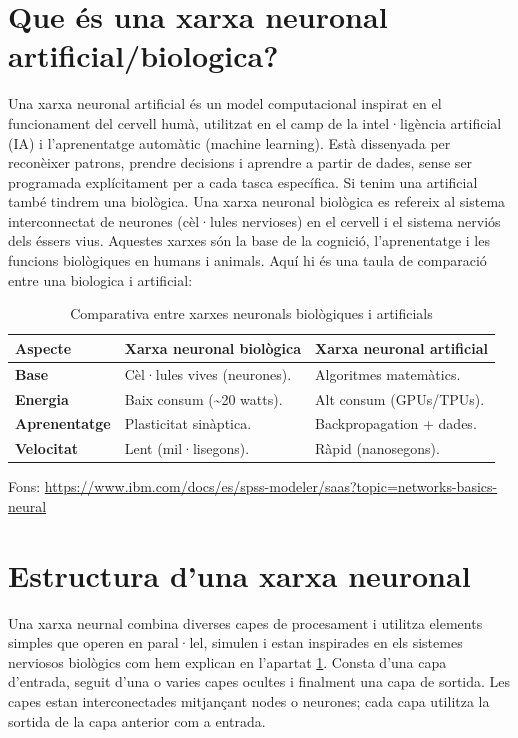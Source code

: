 {\section{Que és una xarxa neuronal artificial/biologica?}\label{sec:xarxa neuronal}
Una xarxa neuronal artificial és un model computacional inspirat en el funcionament del cervell humà, utilitzat en el camp de la intel·ligència artificial (IA) i l'aprenentatge automàtic (machine learning). Està dissenyada per reconèixer patrons, prendre decisions i aprendre a partir de dades, sense ser programada explícitament per a cada tasca específica.
Si tenim una artificial també tindrem una biològica. Una xarxa neuronal biològica es refereix al sistema interconnectat de neurones (cèl·lules nervioses) en el cervell i el sistema nerviós dels éssers vius. Aquestes xarxes són la base de la cognició, l'aprenentatge i les funcions biològiques en humans i animals.
Aquí hi és una taula de comparació entre una biologica i artificial:

\begin{table}[h!]
\begin{tabular}{|l|l|l|}
\hline
\textbf{Aspecte} & \textbf{Xarxa neuronal biològica} & \textbf{Xarxa neuronal artificial} \\ \hline
\textbf{Base} & Cèl·lules vives (neurones). & Algoritmes matemàtics. \\ \hline
\textbf{Energia} & Baix consum (\textasciitilde20 watts). & Alt consum (GPUs/TPUs). \\ \hline
\textbf{Aprenentatge} & Plasticitat sinàptica. & Backpropagation + dades. \\ \hline
\textbf{Velocitat} & Lent (mil·lisegons). & Ràpid (nanosegons). \\ \hline
\end{tabular}
\caption{Comparativa entre xarxes neuronals biològiques i artificials}
\end{table}
Fons: \href{https://www.ibm.com/docs/es/spss-modeler/saas?topic=networks-basics-neural}{https://www.ibm.com/docs/es/spss-modeler/saas?topic=networks-basics-neural}
\section{Estructura d'una xarxa neuronal}\label{sec:3.6}
Una xarxa neurnal combina diverses capes de procesament i utilitza elements simples que operen en paral·lel, simulen i estan inspirades en els sistemes nerviosos biològics com hem explican en l'apartat \ref{sec:xarxa neuronal}. Consta d'una capa d'entrada, seguit d'una o varies capes ocultes i finalment una capa de sortida. Les capes estan interconectades mitjançant nodes o neurones; cada capa utilitza la sortida de la capa anterior com a entrada.

}
